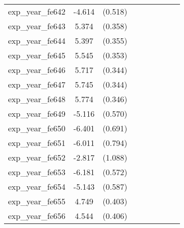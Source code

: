 {\begin{tabular}{l*{4}{cc}}
exp\_year\_fe642&   -4.614\sym{***}&  (0.518)&                  &         &                  &         &                  &         \\
exp\_year\_fe643&    5.374\sym{***}&  (0.358)&                  &         &                  &         &                  &         \\
exp\_year\_fe644&    5.397\sym{***}&  (0.355)&                  &         &                  &         &                  &         \\
exp\_year\_fe645&    5.545\sym{***}&  (0.353)&                  &         &                  &         &                  &         \\
exp\_year\_fe646&    5.717\sym{***}&  (0.344)&                  &         &                  &         &                  &         \\
exp\_year\_fe647&    5.745\sym{***}&  (0.344)&                  &         &                  &         &                  &         \\
exp\_year\_fe648&    5.774\sym{***}&  (0.346)&                  &         &                  &         &                  &         \\
exp\_year\_fe649&   -5.116\sym{***}&  (0.570)&                  &         &                  &         &                  &         \\
exp\_year\_fe650&   -6.401\sym{***}&  (0.691)&                  &         &                  &         &                  &         \\
exp\_year\_fe651&   -6.011\sym{***}&  (0.794)&                  &         &                  &         &                  &         \\
exp\_year\_fe652&   -2.817\sym{**} &  (1.088)&                  &         &                  &         &                  &         \\
exp\_year\_fe653&   -6.181\sym{***}&  (0.572)&                  &         &                  &         &                  &         \\
exp\_year\_fe654&   -5.143\sym{***}&  (0.587)&                  &         &                  &         &                  &         \\
exp\_year\_fe655&    4.749\sym{***}&  (0.403)&                  &         &                  &         &                  &         \\
exp\_year\_fe656&    4.544\sym{***}&  (0.406)&                  &         &                  &         &                  &         \\

\end{tabular}}
